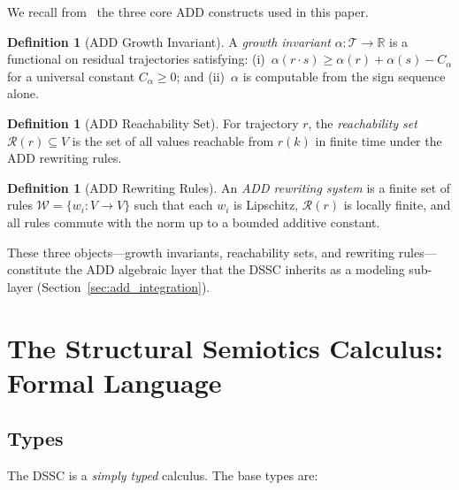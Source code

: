 \documentclass[11pt,a4paper]{article}
\theoremstyle{plain}
\theoremstyle{definition}
\newtheorem{definition}[theorem]{Definition}
\theoremstyle{remark}
\newcommand{\R}{\mathbb{R}}
\begin{document}
We recall from~\cite{add} the three core ADD constructs used in this paper.

\begin{definition}[ADD Growth Invariant]
  A \emph{growth invariant} $\alpha : \mathcal{T} \to \R$ is a functional on residual trajectories
  satisfying: (i)~$\alpha(r \cdot s) \geq \alpha(r) + \alpha(s) - C_\alpha$ for a universal constant
  $C_\alpha \geq 0$; and (ii)~$\alpha$ is computable from the sign sequence alone.
\end{definition}

\begin{definition}[ADD Reachability Set]
  For trajectory $r$, the \emph{reachability set} $\mathcal{R}(r) \subseteq V$ is the set of all
  values reachable from $r(k)$ in finite time under the ADD rewriting rules.
\end{definition}

\begin{definition}[ADD Rewriting Rules]
  An \emph{ADD rewriting system} is a finite set of rules $\mathcal{W} = \{w_i : V \to V\}$
  such that each $w_i$ is Lipschitz, $\mathcal{R}(r)$ is locally finite, and all rules commute
  with the norm up to a bounded additive constant.
\end{definition}

These three objects---growth invariants, reachability sets, and rewriting rules---constitute the
ADD algebraic layer that the DSSC inherits as a modeling sub-layer (Section~\ref{sec:add_integration}).

\section{The Structural Semiotics Calculus: Formal Language}
\label{sec:calculus}

\subsection{Types}

The DSSC is a \emph{simply typed} calculus. The base types are:
\end{document}
